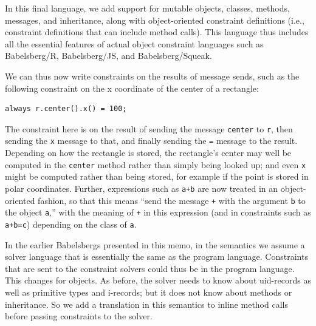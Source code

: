 \documentclass{article}
\begin{document}
In this final language, we add support for mutable objects, classes,
methods, messages, and inheritance, along with object-oriented
constraint definitions (i.e., constraint definitions that can include
method calls).  This language thus includes all the essential features
of actual object constraint languages such as Babelsberg/R,
Babelsberg/JS, and Babelsberg/Squeak.

We can thus now write constraints on the results of message sends,
such as the following constraint on the x coordinate of the center of
a rectangle:
\begin{verbatim}
always r.center().x() = 100;
\end{verbatim}


The constraint here is on the result of sending the message
\verb|center| to \verb|r|, then sending the \verb|x| message to that,
and finally sending the \verb|=| message to the result.  Depending on
how the rectangle is stored, the rectangle's center may well be
computed in the \verb|center| method rather than simply being looked
up; and even \verb|x| might be computed rather than being stored, for
example if the point is stored in polar coordinates.  Further,
expressions such as \verb|a+b| are now treated in an object-oriented
fashion, so that this means ``send the message \verb|+| with the
argument \verb|b| to the object \verb|a|,'' with the meaning of
\verb|+| in this expression (and in constraints such as \verb|a+b=c|)
depending on the class of \verb|a|.

In the earlier Babelsbergs presented in this memo, in the semantics we
assume a solver language that is essentially the same as the program
language. Constraints that are sent to the constraint solvers could
thus be in the program language. This changes for objects. As before,
the solver needs to know about uid-records as well as primitive types
and i-records; but it does not know about methods or inheritance. So
we add a translation in this semantics to inline method calls before
passing constraints to the solver.
\end{document}
